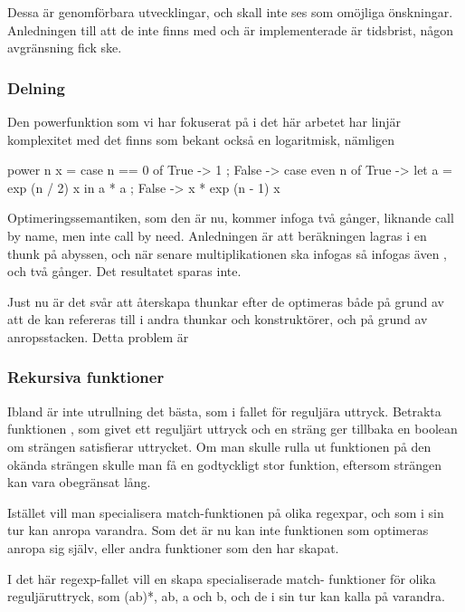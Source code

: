 \documentclass[Rapport]{subfiles}
\begin{document}
Dessa är genomförbara utvecklingar, och skall inte ses som omöjliga önskningar.
Anledningen till att de inte finns med och är implementerade är tidsbrist,
någon avgränsning fick ske.

\subsubsection{Delning}
Den powerfunktion som vi har fokuserat på i det här arbetet har linjär
komplexitet med det finns som bekant också en logaritmisk, nämligen

\begin{codeEx}
power n x = case n == 0 of
    { True  -> 1
    ; False -> case even n of
        { True  -> let a = exp (n / 2) x 
                   in  a * a
        ; False -> x * exp (n - 1) x
        }
    }
\end{codeEx}

Optimeringssemantiken, som den är nu, kommer infoga  två gånger,
liknande call by name, men inte call by need. Anledningen är att beräkningen
 lagras i en thunk på abyssen, och när senare multiplikationen ska
infogas så infogas även , och två gånger. Det resultatet sparas
inte.

    Just nu är det svår att återskapa thunkar efter de optimeras både på grund
av att de kan refereras till i andra thunkar och konstruktörer, och på grund
av anropsstacken. Detta problem är 

\subsubsection{Rekursiva funktioner}

Ibland är inte utrullning det bästa, som i fallet för reguljära uttryck.
Betrakta funktionen , som givet
ett reguljärt uttryck och en sträng ger tillbaka en boolean om strängen
satisfierar uttrycket. Om man skulle rulla ut funktionen på den okända strängen
skulle man få en godtyckligt stor funktion, eftersom strängen kan vara 
obegränsat lång.

    Istället vill man specialisera match-funktionen på olika regexpar, och
som i sin tur kan anropa varandra. Som det är nu kan inte funktionen som
optimeras anropa sig själv, eller andra funktioner som den har skapat.

    I det här regexp-fallet vill en skapa specialiserade match-
funktioner för olika reguljäruttryck, som (ab)*, ab, a och b, och de i sin tur
kan kalla på varandra.
\end{document}
